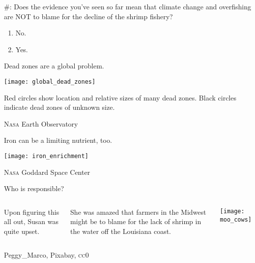 \documentclass[t]{beamer}
\newcommand*{\cq}[1]{%
	\#{\lining#1}:%
}
\begin{document}
\begin{frame}{\cq{7} Does the evidence you’ve seen so far mean that climate change and overfishing are NOT to blame for the decline of the shrimp fishery?}
	
	\begin{enumerate}
		\item No.
		
		\item Yes.
		
	\end{enumerate}
\end{frame}
%
\begin{frame}{Dead zones are a global problem.}

	\texttt{[image: global\_dead\_zones]}
	
	Red circles show location and relative sizes of many dead zones. Black circles indicate dead zones of unknown size.
	
	\vfilll
	
	\hfill \tiny \textsc{Nasa} Earth Observatory
	
\end{frame}
%
\begin{frame}{Iron can be a limiting nutrient, too.}

	\texttt{[image: iron\_enrichment]}
		
	\vfilll
	
	\hfill \tiny \textsc{Nasa} Goddard Space Center
\end{frame}
%
\begin{frame}{Who is responsible?}

	\begin{columns}[t]
	
	
			Upon figuring this all out, Susan was quite upset.  \bigskip

			She was amazed that farmers in the Midwest might 
			be to blame for the lack of shrimp in the water off the 
			Louisiana coast. 
	

			\texttt{[image: moo\_cows]}
				
	\end{columns}

	\vfilll
	
	\hfill \tiny Peggy\_Marco, Pixabay, \textsc{cc0}
	
\end{frame}
%
\end{document}
